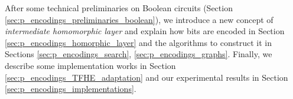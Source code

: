 After some technical preliminaries on Boolean circuits (Section \ref{sec:p_encodings_preliminaries_boolean}), we introduce a new concept of \emph{intermediate homomorphic layer} and explain how bits are encoded  in Section \ref{sec:p_encodings_homorphic_layer} and the algorithms to construct it in Sections \ref{sec:p_encodings_search}, \ref{sec:p_encodings_graphs}. Finally, we describe some implementation works in Section \ref{sec:p_encodings_TFHE_adaptation} and our experimental results in Section \ref{sec:p_encodings_implementations}.










